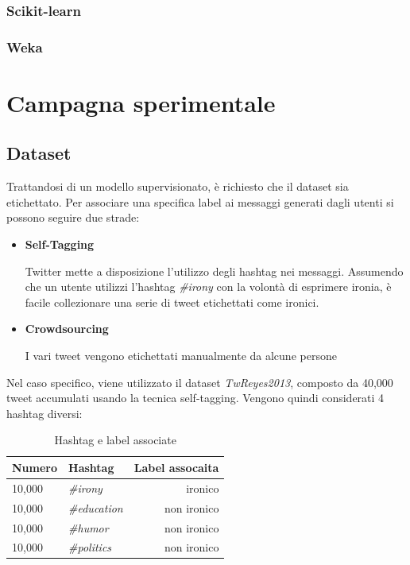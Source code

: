 \documentclass[oneside]{book}
\begin{document}
\subsection{Scikit-learn}
\subsection{Weka}




\chapter{Campagna sperimentale}

\section{Dataset}



Trattandosi di un modello supervisionato, è richiesto che il dataset sia etichettato. Per associare una specifica label ai messaggi generati dagli utenti si possono seguire due strade:

\begin{itemize}
	\item \textbf{Self-Tagging}
	
	\label{chap:self-taggin}
	Twitter mette a disposizione l'utilizzo degli hashtag nei messaggi. Assumendo che un utente utilizzi l'hashtag \emph{\#irony} con la volontà di esprimere ironia, è facile collezionare una serie di tweet etichettati come ironici.
	
	\item \textbf{Crowdsourcing}
	
	I vari tweet vengono etichettati manualmente da alcune persone
	
	
\end{itemize}

Nel caso specifico, viene utilizzato il dataset \emph{TwReyes2013}, composto da 40,000 tweet accumulati usando la tecnica self-tagging. Vengono quindi considerati 4 hashtag diversi:


\begin{table}[ht]
	\centering
	\begin{tabular}[t]{llr}
		\hline
		\textbf{Numero} & \textbf{Hashtag}  & \textbf{Label assocaita}\\
		\hline
		10,000 & \emph{\#irony}     & ironico     \\
		10,000 & \emph{\#education} & non ironico \\
		10,000 & \emph{\#humor}     & non ironico \\
		10,000 & \emph{\#politics}  & non ironico \\
		\hline
	\end{tabular}
	\caption{Hashtag e label associate}
\end{table}%
\end{document}
